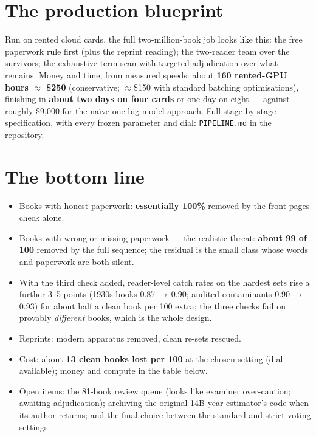 \documentclass[11pt]{article}
\begin{document}
\section{The production blueprint}
Run on rented cloud cards, the full two-million-book job looks like this: the free paperwork rule
first (plus the reprint reading); the two-reader team over the survivors; the exhaustive term-scan
with targeted adjudication over what remains. Money and time, from measured speeds:
about \textbf{160 rented-GPU hours $\approx$ \$250} (conservative; $\approx$\$150 with standard
batching optimisations), finishing in \textbf{about two days on four cards} or one day on eight ---
against roughly \$9{,}000 for the na\"ive one-big-model approach. Full stage-by-stage specification,
with every frozen parameter and dial: \texttt{PIPELINE.md} in the repository.

\section{The bottom line}
\begin{itemize}[leftmargin=1.4em,itemsep=2pt]
\item Books with honest paperwork: \textbf{essentially 100\%} removed by the front-pages check alone.
\item Books with wrong or missing paperwork --- the realistic threat: \textbf{about 99 of 100} removed
      by the full sequence; the residual is the small class whose words and paperwork are both silent.
\item With the third check added, reader-level catch rates on the hardest sets rise a further 3--5
      points (1930s books 0.87\,$\to$\,0.90; audited contaminants 0.90\,$\to$\,0.93) for about half a
      clean book per 100 extra; the three checks fail on provably \emph{different} books, which is the
      whole design.
\item Reprints: modern apparatus removed, clean re-sets rescued.
\item Cost: about \textbf{13 clean books lost per 100} at the chosen setting (dial available); money
      and compute in the table below.
\item Open items: the 81-book review queue (looks like examiner over-caution; awaiting adjudication);
      archiving the original 14B year-estimator's code when its author returns; and the final choice
      between the standard and strict voting settings.
\end{itemize}
\end{document}
